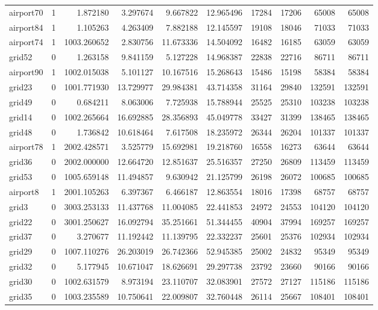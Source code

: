 \begin{longtable}{|l|r|r|r|r|r|r|r|r|r|}
airport70 & 1 & 1.872180 & 3.297674 & 9.667822 & 12.965496 & 17284 & 17206 & 65008 & 65008 \\
airport84 & 1 & 1.105263 & 4.263409 & 7.882188 & 12.145597 & 19108 & 18046 & 71033 & 71033 \\
airport74 & 1 & 1003.260652 & 2.830756 & 11.673336 & 14.504092 & 16482 & 16185 & 63059 & 63059 \\
grid52 & 0 & 1.263158 & 9.841159 & 5.127228 & 14.968387 & 22838 & 22716 & 86711 & 86711 \\
airport90 & 1 & 1002.015038 & 5.101127 & 10.167516 & 15.268643 & 15486 & 15198 & 58384 & 58384 \\
grid23 & 0 & 1001.771930 & 13.729977 & 29.984381 & 43.714358 & 31164 & 29840 & 132591 & 132591 \\
grid49 & 0 & 0.684211 & 8.063006 & 7.725938 & 15.788944 & 25525 & 25310 & 103238 & 103238 \\
grid14 & 0 & 1002.265664 & 16.692885 & 28.356893 & 45.049778 & 33427 & 31399 & 138465 & 138465 \\
grid48 & 0 & 1.736842 & 10.618464 & 7.617508 & 18.235972 & 26344 & 26204 & 101337 & 101337 \\
airport78 & 1 & 2002.428571 & 3.525779 & 15.692981 & 19.218760 & 16558 & 16273 & 63644 & 63644 \\
grid36 & 0 & 2002.000000 & 12.664720 & 12.851637 & 25.516357 & 27250 & 26809 & 113459 & 113459 \\
grid53 & 0 & 1005.659148 & 11.494857 & 9.630942 & 21.125799 & 26198 & 26072 & 100685 & 100685 \\
airport8 & 1 & 2001.105263 & 6.397367 & 6.466187 & 12.863554 & 18016 & 17398 & 68757 & 68757 \\
grid3 & 0 & 3003.253133 & 11.437768 & 11.004085 & 22.441853 & 24972 & 24553 & 104120 & 104120 \\
grid22 & 0 & 3001.250627 & 16.092794 & 35.251661 & 51.344455 & 40904 & 37994 & 169257 & 169257 \\
grid37 & 0 & 3.270677 & 11.192442 & 11.139795 & 22.332237 & 25601 & 25376 & 102934 & 102934 \\
grid29 & 0 & 1007.110276 & 26.203019 & 26.742366 & 52.945385 & 25002 & 24832 & 95349 & 95349 \\
grid32 & 0 & 5.177945 & 10.671047 & 18.626691 & 29.297738 & 23792 & 23660 & 90166 & 90166 \\
grid30 & 0 & 1002.631579 & 8.973194 & 23.110707 & 32.083901 & 27572 & 27127 & 115186 & 115186 \\
grid35 & 0 & 1003.235589 & 10.750641 & 22.009807 & 32.760448 & 26114 & 25667 & 108401 & 108401 \\

\end{longtable}
